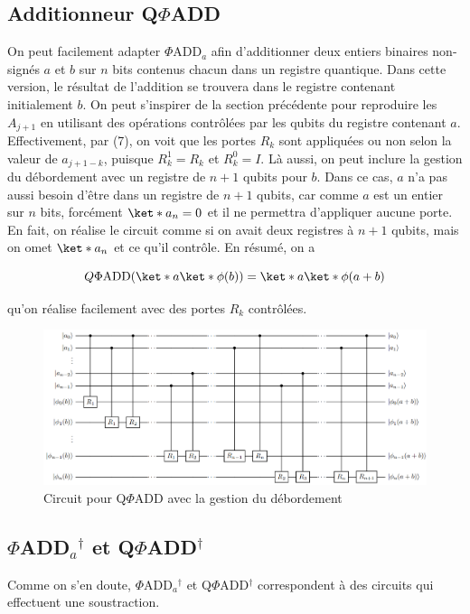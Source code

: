 \subsection{Additionneur Q$\Phi$ADD}
On peut facilement adapter $\Phi$ADD$_a$ afin d'additionner deux entiers binaires non-signés $a$ et $b$ sur $n$ bits contenus chacun dans un registre quantique. Dans cette version, le résultat de l'addition se trouvera dans le registre contenant initialement $b$. On peut s'inspirer de la section précédente pour reproduire les $A_{j+1}$ en utilisant des opérations contrôlées par les qubits du registre contenant $a$. Effectivement, par (7), on voit que les portes $R_k$ sont appliquées ou non selon la valeur de $a_{j+1-k}$, puisque $R_k^1 = R_k$ et $R_k^0 = I$. Là aussi, on peut inclure la gestion du débordement avec un registre de $n+1$ qubits pour $b$. Dans ce cas, $a$ n'a pas aussi besoin d'être dans un registre de $n+1$ qubits, car comme $a$ est un entier sur $n$ bits, forcément $\ket*{a_n} = 0$ et il ne permettra d'appliquer aucune porte. En fait, on réalise le circuit comme si on avait deux registres à $n+1$ qubits, mais on omet $\ket*{a_n}$ et ce qu'il contrôle. En résumé, on a

\begin{equation}
    Q\Phi \text{ADD} (\ket*{a} \ket*{\phi(b)}) = \ket*{a} \ket*{\phi(a+b)}
\end{equation}

qu'on réalise facilement avec des portes $R_k$ contrôlées.

\begin{figure}[H]
    \centering
    \includegraphics[scale=0.42]{images/qadd.png} 
    \caption{Circuit pour Q$\Phi$ADD avec la gestion du débordement}
\end{figure}

\subsection{$\Phi$ADD$_a$$^\dag$ et Q$\Phi$ADD$^\dag$}
Comme on s'en doute, $\Phi$ADD$_a$$^\dag$ et Q$\Phi$ADD$^\dag$ correspondent à des circuits qui effectuent une soustraction. 

